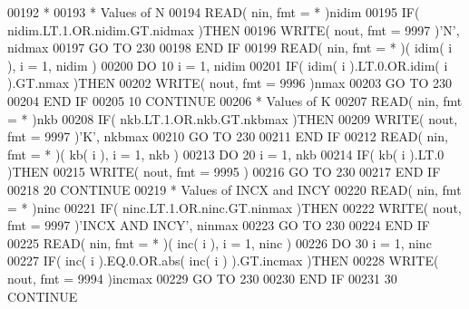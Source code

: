 \begin{DoxyCode}
00192 \textcolor{comment}{*}
00193 \textcolor{comment}{*     Values of N}
00194       \textcolor{keyword}{READ}( nin, fmt = * )nidim
00195       \textcolor{keywordflow}{IF}( nidim.LT.1.OR.nidim.GT.nidmax )\textcolor{keywordflow}{THEN}
00196          \textcolor{keyword}{WRITE}( nout, fmt = 9997 )\textcolor{stringliteral}{'N'}, nidmax
00197          \textcolor{keywordflow}{GO TO} 230
00198 \textcolor{keywordflow}{      END IF}
00199       \textcolor{keyword}{READ}( nin, fmt = * )( idim( i ), i = 1, nidim )
00200       \textcolor{keywordflow}{DO} 10 i = 1, nidim
00201          \textcolor{keywordflow}{IF}( idim( i ).LT.0.OR.idim( i ).GT.nmax )\textcolor{keywordflow}{THEN}
00202             \textcolor{keyword}{WRITE}( nout, fmt = 9996 )nmax
00203             \textcolor{keywordflow}{GO TO} 230
00204 \textcolor{keywordflow}{         END IF}
00205    10 \textcolor{keywordflow}{CONTINUE}
00206 \textcolor{comment}{*     Values of K}
00207       \textcolor{keyword}{READ}( nin, fmt = * )nkb
00208       \textcolor{keywordflow}{IF}( nkb.LT.1.OR.nkb.GT.nkbmax )\textcolor{keywordflow}{THEN}
00209          \textcolor{keyword}{WRITE}( nout, fmt = 9997 )\textcolor{stringliteral}{'K'}, nkbmax
00210          \textcolor{keywordflow}{GO TO} 230
00211 \textcolor{keywordflow}{      END IF}
00212       \textcolor{keyword}{READ}( nin, fmt = * )( kb( i ), i = 1, nkb )
00213       \textcolor{keywordflow}{DO} 20 i = 1, nkb
00214          \textcolor{keywordflow}{IF}( kb( i ).LT.0 )\textcolor{keywordflow}{THEN}
00215             \textcolor{keyword}{WRITE}( nout, fmt = 9995 )
00216             \textcolor{keywordflow}{GO TO} 230
00217 \textcolor{keywordflow}{         END IF}
00218    20 \textcolor{keywordflow}{CONTINUE}
00219 \textcolor{comment}{*     Values of INCX and INCY}
00220       \textcolor{keyword}{READ}( nin, fmt = * )ninc
00221       \textcolor{keywordflow}{IF}( ninc.LT.1.OR.ninc.GT.ninmax )\textcolor{keywordflow}{THEN}
00222          \textcolor{keyword}{WRITE}( nout, fmt = 9997 )\textcolor{stringliteral}{'INCX AND INCY'}, ninmax
00223          \textcolor{keywordflow}{GO TO} 230
00224 \textcolor{keywordflow}{      END IF}
00225       \textcolor{keyword}{READ}( nin, fmt = * )( inc( i ), i = 1, ninc )
00226       \textcolor{keywordflow}{DO} 30 i = 1, ninc
00227          \textcolor{keywordflow}{IF}( inc( i ).EQ.0.OR.abs( inc( i ) ).GT.incmax )\textcolor{keywordflow}{THEN}
00228             \textcolor{keyword}{WRITE}( nout, fmt = 9994 )incmax
00229             \textcolor{keywordflow}{GO TO} 230
00230 \textcolor{keywordflow}{         END IF}
00231    30 \textcolor{keywordflow}{CONTINUE}

\end{DoxyCode}
